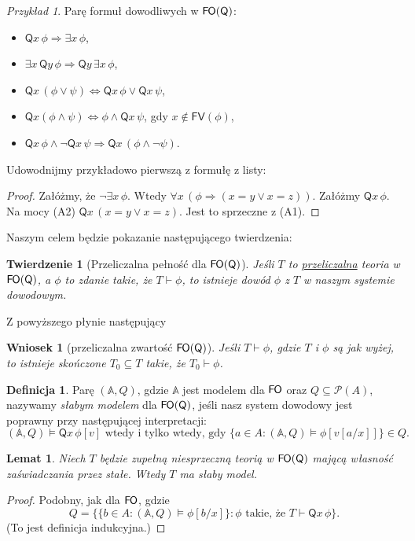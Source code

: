 \documentclass{article}
\newcommand{\A}{\mathbb{A}}
\theoremstyle{plain}
\newtheorem{tw}[thm]{Twierdzenie}
\newtheorem{wn}[thm]{Wniosek}
\newtheorem{lem}[thm]{Lemat}
\theoremstyle{definition}
\newtheorem{df}[thm]{Definicja}
\theoremstyle{remark}
\newtheorem{prz}[thm]{Przykład}
\newcommand{\FO}{\mathsf{F \mkern-1.4mu O}}
\newcommand{\q}{\mathsf{Q}}
\begin{document}
\begin{prz}
	Parę formuł dowodliwych w $\FO(\q)$:
	\begin{itemize}
		\item $\q x \, \phi \Rightarrow \exists x \, \phi$,
		\item $\exists x \,\q y \, \phi \Rightarrow \q y \, \exists x
			\, \phi$,
		\item $\q x \, (\phi \vee \psi) \iff \q x \, \phi \vee \q x \,
			\psi$,
		\item $\q x (\phi \wedge \psi) \iff \phi \wedge \q x \, \psi$,
			gdy $x \not \in \mathsf{FV}(\phi)$,
		\item $\q x \, \phi \wedge \neg \q x \, \psi \Rightarrow \q x
			\, (\phi \wedge \neg \psi)$.
	\end{itemize}
\end{prz}
Udowodnijmy przykładowo pierwszą z formułę z listy:
\begin{proof}
	 Załóżmy, że $\neg \exists x \, \phi$.
	 Wtedy $\forall x \, (\phi \Rightarrow (x = y \vee x = z))$.
	 Załóżmy $\q x \, \phi$.
	 Na mocy (A2) $\q x \, (x = y \vee x = z)$.
	 Jest to sprzeczne z (A1).
\end{proof}

Naszym celem będzie pokazanie następującego twierdzenia:
\begin{tw}[Przeliczalna pełność dla $\FO(\q)$]
	Jeśli $T$ to \underline{przeliczalna} teoria w $\FO(\q)$, a $\phi$ to
	zdanie takie, że $T \vdash \phi$, to istnieje dowód $\phi$ z $T$ w
	naszym systemie dowodowym.
\end{tw}
Z powyższego płynie następujący
\begin{wn}[przeliczalna zwartość $\FO(\q)$]
	 Jeśli $T \vdash \phi$, gdzie $T$ i $\phi$ są jak wyżej, to istnieje
	 skończone $T_0 \subseteq T$ takie, że $T_0 \vdash \phi$.
\end{wn}

\begin{df}
	Parę $(\A, Q)$, gdzie $\A$ jest modelem dla $\FO$ oraz $Q \subseteq
	\mathcal{P}(A)$, nazywamy \textit{słabym modelem} dla $\FO(\q)$,
	jeśli nasz system dowodowy jest poprawny przy następującej interpretacji:
	\[
		(\A, Q) \models \q x \, \phi[v] \text{ wtedy i tylko wtedy, gdy }
		\{a \in A \colon (\A, Q) \models \phi[v[a/x]]\} \in Q.
	\]

\end{df}

\begin{lem}
\label{lem:slaby_model}
	Niech $T$ będzie zupełną niesprzeczną teorią w $\FO(\q)$ mającą
	własność zaświadczania przez stałe. Wtedy $T$ ma słaby model.
\end{lem}
\begin{proof}
	 Podobny, jak dla $\FO$, gdzie
	 \[
		 Q = \{\{ b \in A \colon (\A, Q) \models \phi[b/x]\} \colon \phi \text{ takie, że } T \vdash \q x \, \phi \}.
	 \]
	 (To jest definicja indukcyjna.)
\end{proof}
\end{document}

